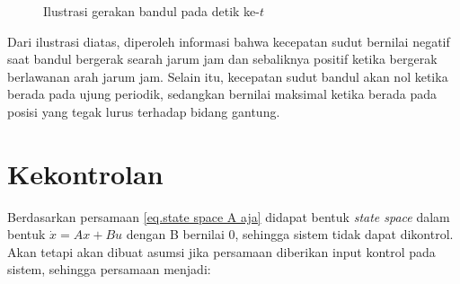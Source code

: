 \documentclass{article}
\begin{document}
\begin{figure}[H]
    \caption{Ilustrasi gerakan bandul pada detik ke-$t$}
\end{figure}
Dari ilustrasi diatas, diperoleh informasi bahwa kecepatan sudut bernilai negatif saat bandul bergerak searah jarum jam dan sebaliknya positif ketika bergerak berlawanan arah jarum jam. Selain itu, kecepatan sudut bandul akan nol ketika berada pada ujung periodik, sedangkan bernilai maksimal ketika berada pada posisi yang tegak lurus terhadap bidang gantung.

\section{Kekontrolan}
Berdasarkan persamaan \eqref{eq.state space A aja} didapat bentuk \textit{state space} dalam bentuk $\dot{x} = Ax + Bu$ dengan B bernilai 0, sehingga sistem tidak dapat dikontrol. Akan tetapi akan dibuat asumsi jika persamaan diberikan input kontrol pada sistem, sehingga persamaan menjadi:
\end{document}
